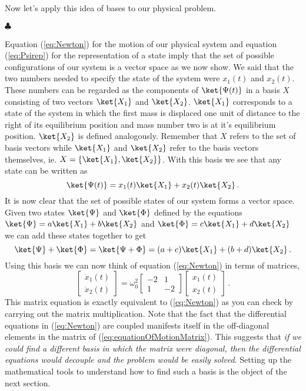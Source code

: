 Now let's apply this idea of bases to our physical problem.
\begin{flushleft} $\clubsuit$ \end{flushleft}
Equation (\ref{eq:Newton}) for the motion of our physical system and equation (\ref{eq:Psirep}) for the representation of a state imply that the set of possible configurations of our system is a vector space as we now show.
We said that the two numbers needed to specify the state of the system were $x_{1}(t)$ and $x_{2}(t)$.
These numbers can be regarded as the components of $\ket{\Psi (t)}$ in a basis $X$ consisting of two vectors $\ket{X_1}$ and $\ket{X_2}$.
$\ket{X_1}$ corresponds to a state of the system in which the first mass is displaced one unit of distance to the right of its equilibrium position and mass number two is at it's equilibrium position.
$\ket{X_2}$ is defined analogously.
Remember that $X$ refers to the set of basis vectors while $\ket{X_1}$ and $\ket{X_2}$ refer to the basis vectors themselves, ie. $X=\{\ket{X_1},\ket{X_2}\}$.
With this basis we see that any state can be written as
\begin{equation} \label{eq:Psirep2}
\ket{\Psi (t)} = x_{1}(t)\ket{X_1} + x_{2}(t)\ket{X_2} \, .
\end{equation}
It is now clear that the set of possible states of our system forms a vector space.
Given two states $\ket{\Psi}$ and $\ket{\Phi}$ defined by the equations \mbox{$\ket{\Psi} = a\ket{X_1} + b\ket{X_2}$} and \mbox{$\ket{\Phi} = c\ket{X_1} + d\ket{X_2}$} we can add these states together to get
\begin{displaymath}
\ket{\Psi} + \ket{\Phi} = \ket{\Psi + \Phi} = (a+c)\ket{X_1} + (b+d)\ket{X_2} \, .
\end{displaymath}
Using this basis we can now think of equation (\ref{eq:Newton}) in terms of matrices,
\begin{equation} \label{eq:equationOfMotionMatrix}
\left[ \begin{array}{c} \ddot{x}_1(t) \\ \ddot{x}_2(t) \end{array} \right] = \omega^{2}_{0}\left[ \begin{array}{cc} -2 & 1 \\ 1 & -2 \end{array} \right] \left[ \begin{array}{c} x_{1}(t) \\ x_{2}(t) \end{array} \right] \, .
\end{equation}
This matrix equation is exactly equivalent to (\ref{eq:Newton}) as you can check by carrying out the matrix multiplication.
Note that the fact that the differential equations in (\ref{eq:Newton}) are coupled manifests itself in the off-diagonal elements in the matrix of (\ref{eq:equationOfMotionMatrix}).
This suggests that \emph{if we could find a different basis in which the matrix were diagonal, then the differential equations would decouple and the problem would be easily solved}.
Setting up the mathematical tools to understand how to find such a basis is the object of the next section.

